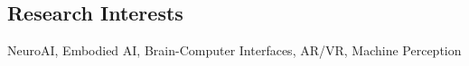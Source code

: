 \subsection*{\textbf{Research Interests}}
NeuroAI, Embodied AI, Brain-Computer Interfaces, AR/VR, Machine Perception